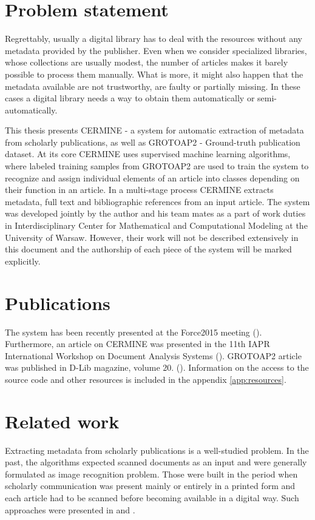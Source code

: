 \section{Problem statement}
Regrettably, usually a digital library has to deal with the resources without any metadata provided by the publisher. Even when we consider specialized libraries, whose collections are usually modest, the number of articles makes it barely possible to process them manually. What is more, it might also happen that the metadata available are not trustworthy, are faulty or partially missing. In these cases a digital library needs a way to obtain them automatically or semi-automatically.

This thesis presents CERMINE - a system for automatic extraction of metadata from scholarly publications, as well as GROTOAP2 - Ground-truth publication dataset. At its core CERMINE uses supervised machine learning algorithms, where labeled training samples from GROTOAP2 are used to train the system to recognize and assign individual elements of an article into classes depending on their function in an article. In a multi-stage process CERMINE extracts metadata, full text and bibliographic references from an input article. The system was developed jointly by the author and his team mates as a part of work duties in Interdisciplinary Center for Mathematical and Computational Modeling at the University of Warsaw. However, their work will not be described extensively in this document and the authorship of each piece of the system will be marked explicitly.

\section{Publications}
The system has been recently presented at the Force2015 meeting (\cite{Force2015}). Furthermore, an article on CERMINE was presented in the 11th IAPR International Workshop on Document Analysis Systems (\cite{DominikaTkaczykPaweSzostekMateuszFedoryszakPiotrJanDendek2014}). GROTOAP2 article was published in D-Lib magazine, volume 20. (\cite{DominikaTkaczykPaweSzostek2014}).
Information on the access to the source code and other resources is included in the appendix \ref{app:resources}.

\section{Related work}\label{sec:related_work}
Extracting metadata from scholarly publications is a well-studied problem. In the past, the algorithms expected scanned documents as an input and were generally formulated as image recognition problem. Those were built in the period when scholarly communication was present mainly or entirely in a printed form and each article had to be scanned before becoming available in a digital way. Such approaches were presented in \cite{Thoma2001} and \cite{Flynn2007}.

